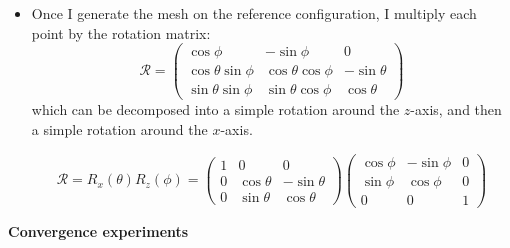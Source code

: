 \documentclass{article}
\begin{document}
\begin{itemize}
\begin{center}
  \end{center}
\item Once I generate the mesh on the reference configuration, I
  multiply each point by the rotation matrix:
  \[
    \mathcal{R} =
    \begin{pmatrix}
      \cos\phi & -\sin\phi & 0 \\
      \cos\theta \sin\phi & \cos\theta \cos\phi & -\sin\theta \\
      \sin\theta \sin\phi & \sin\theta \cos\phi & \cos\theta
    \end{pmatrix}
  \]
  which can be decomposed into a simple rotation around the $z$-axis,
  and then a simple rotation around the $x$-axis.

  \[
    \mathcal{R} = R_x(\theta) R_z(\phi) =
    \begin{pmatrix}
      1 & 0 & 0 \\
      0 & \cos\theta & -\sin\theta \\
      0 & \sin\theta & \cos\theta
    \end{pmatrix}
    \begin{pmatrix}
      \cos\phi & -\sin\phi & 0 \\
      \sin\phi & \cos\phi & 0 \\
      0 & 0 & 1
    \end{pmatrix}
  \]
\end{itemize}

\textbf{Convergence experiments}
\end{document}
